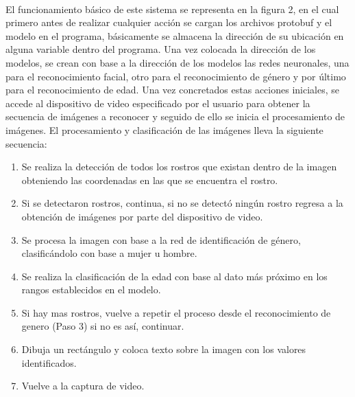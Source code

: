 \documentclass[9pt]{report}
\begin{document}
\begin{multicols}{2}
	\paragraph{}
	El funcionamiento básico de este sistema se representa en la figura 2, en el cual primero antes de realizar cualquier acción se cargan los archivos protobuf y el modelo en el programa, básicamente se almacena la dirección de su ubicación en alguna variable dentro del programa. Una vez colocada la dirección de los modelos, se crean con base a la dirección de los modelos las redes neuronales, una para el reconocimiento facial, otro para el reconocimiento de género y por último para el reconocimiento de edad. Una vez concretados estas acciones iniciales, se accede al dispositivo de video especificado por el usuario para obtener la secuencia de imágenes a reconocer y seguido de ello se inicia el procesamiento de imágenes. El procesamiento y clasificación de las imágenes lleva la siguiente secuencia:
	\begin{enumerate}
		\item Se realiza la detección de todos los rostros que existan dentro de la imagen obteniendo las coordenadas en las que se encuentra el rostro.
		\item Si se detectaron rostros, continua, si no se detectó ningún rostro regresa a la obtención de imágenes por parte del dispositivo de video.
		\item Se procesa la imagen con base a la red de identificación de género, clasificándolo con base a mujer u hombre.
		\item Se realiza la clasificación de la edad con base al dato más próximo en los rangos establecidos en el modelo.
		\item Si hay mas rostros, vuelve a repetir el proceso desde el reconocimiento de genero (Paso 3) si no es así, continuar.
		\item Dibuja un rectángulo y coloca texto sobre la imagen con los valores identificados.
		\item Vuelve a la captura de video.
	\end{enumerate}

\end{multicols}
\end{document}
